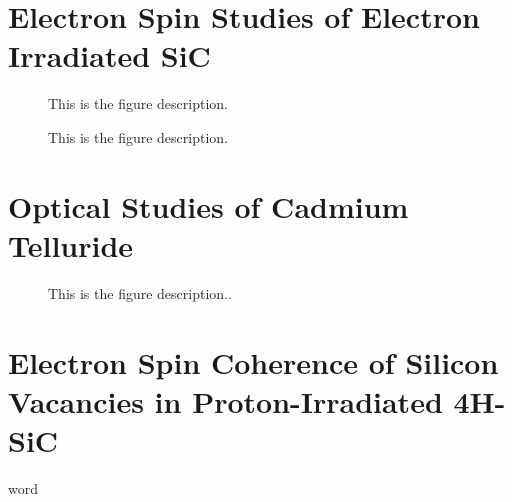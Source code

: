 \documentclass[oneside, astronomy, noacknowlegments]{BYUPhys}
\begin{document}
\begin{appendices}

\chapter{Electron Spin Studies of Electron Irradiated SiC}
\label{chpt:AppendA}

\begin{figure}
    \caption[Electron-irradiated SiC lifetime  summary]{\label{fig:e17results}
     This is the figure description.}
 \end{figure}

\begin{figure}
    \caption[ODMR/Photoluminescence vs temperature]{\label{fig:ODMRPL}
     This is the figure description.}
 \end{figure}

\chapter{Optical Studies of Cadmium Telluride}
\label{chpt:AppendB}

\begin{figure}
    \caption[Photoluminescence of CdTe]{\label{fig:CdTePL}
     This is the figure description..}
 \end{figure}

\chapter{Electron Spin Coherence of Silicon Vacancies in Proton-Irradiated 4H-SiC}
\label{chpt:AppendC}

\end{appendices}

word
\cite{RefWorks:doc:58929816e4b0499fa95c51a6}
\cite{RefWorks:doc:58929629e4b0d4c09201f6b8}
\cite{RefWorks:doc:589299f4e4b0d4c09201f915}
\cite{RefWorks:doc:58929128e4b0228a292928a7}
\cite{RefWorks:doc:589299fbe4b0dec22aee3bd8}
\cite{RefWorks:doc:5892912ae4b0dec22aee3993}
\cite{RefWorks:doc:58929128e4b0499fa95c5064}
\cite{RefWorks:doc:5892989ee4b0499fa95c51c8}
\cite{RefWorks:doc:589293f5e4b0dec22aee39de}
\cite{RefWorks:doc:589295fce4b0d4c09201f6b4}
\cite{RefWorks:doc:58929a02e4b0d4c09201f91b}
\cite{RefWorks:doc:589295bde4b0d4c09201f692}
\cite{RefWorks:doc:58929264e4b0d4c09201f63b}
\cite{RefWorks:doc:58929129e4b0d4c09201f61e}
\cite{RefWorks:doc:58929602e4b0d4c09201f6b6}
\cite{RefWorks:doc:589296c6e4b0d4c09201f6f5}
\cite{RefWorks:doc:58929746e4b0dec22aee3a9a}
\cite{RefWorks:doc:589297a9e4b0d4c09201f736}
\cite{RefWorks:doc:58929800e4b0499fa95c51a1}
\cite{RefWorks:doc:589299f0e4b0dec22aee3bd6}
\cite{RefWorks:doc:58929786e4b0228a292929b8}
\cite{RefWorks:doc:58929612e4b0499fa95c50fa}
\cite{RefWorks:doc:5892964ee4b0499fa95c5108}
\cite{RefWorks:doc:58929c15e4b0228a29292c58}
\cite{RefWorks:doc:5892912ae4b0228a292928aa}
\end{document}
